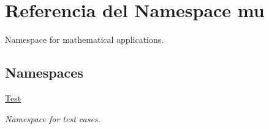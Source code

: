 \hypertarget{namespacemu}{}\section{Referencia del Namespace mu}
\label{namespacemu}


Namespace for mathematical applications.  


\subsection*{Namespaces}
\begin{DoxyCompactItemize}
\item 
 \hyperlink{namespacemu_1_1_test}{Test}
\begin{DoxyCompactList}\small\item\em Namespace for test cases. \end{DoxyCompactList}\end{DoxyCompactItemize}
